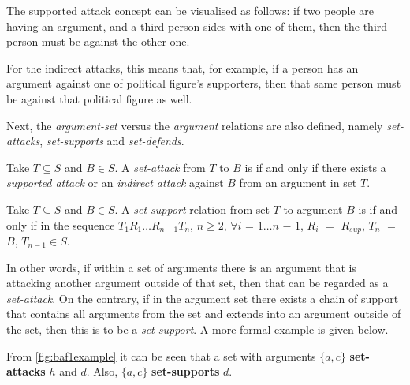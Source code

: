             The supported attack concept can be visualised as follows: if two people are having an argument, and a third person sides with one of them, then the third person must be against the other one.
            
            For the indirect attacks, this means that, for example, if a person has an argument against one of political figure's supporters, then that same person must be against that political figure as well.
            
            Next, the \textit{argument-set} versus the \textit{argument} relations are also defined, namely \textit{set-attacks}, \textit{set-supports} and \textit{set-defends}.
            
            \begin{definition}
                Take $T \subseteq S$ and $B \in S$. A \textit{set-attack} from $T$ to $B$ is if and only if there exists a \textit{supported attack} or an \textit{indirect attack} against $B$ from an argument in set $T$.
                \label{definition:definition13}
            \end{definition}
            
            \begin{definition}
                Take $T \subseteq S$ and $B \in S$. A \textit{set-support} relation from set $T$ to argument $B$ is if and only if in the sequence $T_{1} R_{1} \ldots R_{n - 1} T_{n}$, $n \geq 2$, $\forall i$ = $1 \ldots n$ $-$ $1$, $R_{i}$ $=$ $R_{sup}$, $T_{n}$ $=$ $B$, $T_{n - 1} \in S$.
                \label{definition:definition14}
            \end{definition}
            
            In other words, if within a set of arguments there is an argument that is attacking another argument outside of that set, then that can be regarded as a \textit{set-attack}. On the contrary, if in the argument set there exists a chain of support that contains all arguments from the set and extends into an argument outside of the set, then this is to be a \textit{set-support}. A more formal example is given below.
            
            \begin{exa}
                From \autoref{fig:baf1example} it can be seen that a set with arguments $\{a, c\}$ \textbf{set-attacks} $h$ and $d$. Also, $\{a, c\}$ \textbf{set-supports} $d$.
                \label{exa:example12}
            \end{exa}
            
